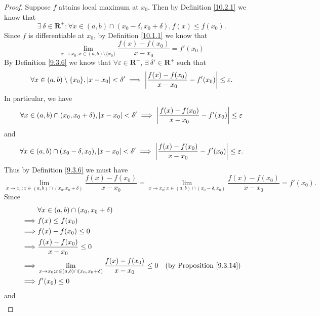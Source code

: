 \begin{proof}
    Suppose \(f\) attains local maximum at \(x_0\).
    Then by Definition \ref{10.2.1} we know that
    \[
        \exists\ \delta \in \mathbf{R}^+ : \forall x \in (a, b) \cap (x_0 - \delta, x_0 + \delta), f(x) \leq f(x_0).
    \]
    Since \(f\) is differentiable at \(x_0\), by Definition \ref{10.1.1} we know that
    \[
        \lim_{x \to x_0 ; x \in (a, b) \setminus \{x_0\}} \frac{f(x) - f(x_0)}{x - x_0} = f'(x_0)
    \]
    By Definition \ref{9.3.6} we know that \(\forall \varepsilon \in \mathbf{R}^+\), \(\exists\ \delta' \in \mathbf{R}^+\) such that
    \[
        \forall x \in (a, b) \setminus \{x_0\}, \abs*{x - x_0} < \delta' \implies \abs*{\frac{f(x) - f(x_0)}{x - x_0} - f'(x_0)} \leq \varepsilon.
    \]
    In particular, we have
    \[
        \forall x \in (a, b) \cap (x_0, x_0 + \delta), \abs*{x - x_0} < \delta' \implies \abs*{\frac{f(x) - f(x_0)}{x - x_0} - f'(x_0)} \leq \varepsilon
    \]
    and
    \[
        \forall x \in (a, b) \cap (x_0 - \delta, x_0), \abs*{x - x_0} < \delta' \implies \abs*{\frac{f(x) - f(x_0)}{x - x_0} - f'(x_0)} \leq \varepsilon.
    \]
    Thus by Definition \ref{9.3.6} we must have
    \[
        \lim_{x \to x_0 ; x \in (a, b) \cap (x_0, x_0 + \delta)} \frac{f(x) - f(x_0)}{x - x_0} = \lim_{x \to x_0 ; x \in (a, b) \cap (x_0 - \delta, x_0)} \frac{f(x) - f(x_0)}{x - x_0} = f'(x_0).
    \]
    Since
    \begin{align*}
                 & \forall x \in (a, b) \cap (x_0, x_0 + \delta)                                                                                        \\
        \implies & f(x) \leq f(x_0)                                                                                                                     \\
        \implies & f(x) - f(x_0) \leq 0                                                                                                                 \\
        \implies & \frac{f(x) - f(x_0)}{x - x_0} \leq 0                                                                                                 \\
        \implies & \lim_{x \to x_0 ; x \in (a, b) \cap (x_0, x_0 + \delta)} \frac{f(x) - f(x_0)}{x - x_0} \leq 0 & \text{(by Proposition \ref{9.3.14})} \\
        \implies & f'(x_0) \leq 0
    \end{align*}
    and
    \begin{align*}

\end{align*}
\end{proof}
